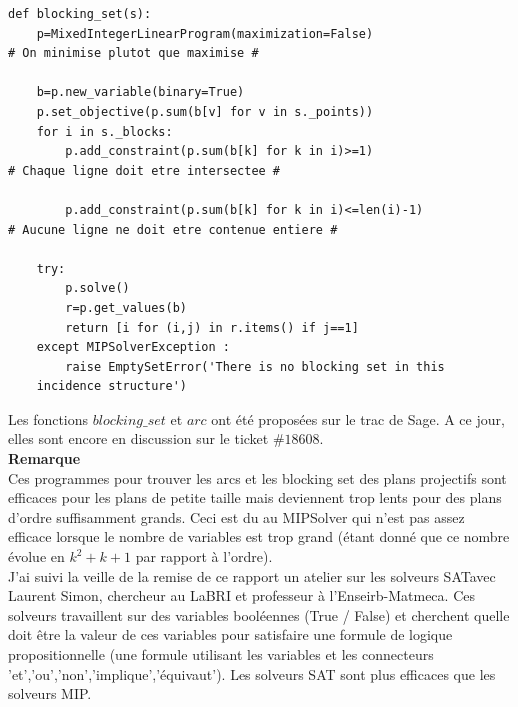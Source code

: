 \documentclass[a4paper]{article}
\begin{document}
\begin{lstlisting}
def blocking_set(s):
    p=MixedIntegerLinearProgram(maximization=False)
# On minimise plutot que maximise #

    b=p.new_variable(binary=True)
    p.set_objective(p.sum(b[v] for v in s._points))
    for i in s._blocks:
        p.add_constraint(p.sum(b[k] for k in i)>=1)
# Chaque ligne doit etre intersectee #

        p.add_constraint(p.sum(b[k] for k in i)<=len(i)-1)
# Aucune ligne ne doit etre contenue entiere #
        
    try:
        p.solve()
        r=p.get_values(b)
        return [i for (i,j) in r.items() if j==1]
    except MIPSolverException :
        raise EmptySetError('There is no blocking set in this
    incidence structure')  
\end{lstlisting}
\vspace{1\baselineskip}
Les fonctions $blocking\_set$ et $arc$ ont été proposées sur le trac de Sage. A ce jour, elles sont encore en discussion sur le ticket $\#18608$.\vspace{3\baselineskip}\\

\textbf{Remarque}\\
Ces programmes pour trouver les arcs et les blocking set des plans projectifs sont efficaces pour les plans de petite taille mais deviennent trop lents pour des plans d'ordre suffisamment grands. Ceci est du au MIPSolver qui n'est pas assez efficace lorsque le nombre de variables est trop grand (étant donné que ce nombre évolue en $k^2 + k + 1$ par rapport à l'ordre).\\
J'ai suivi la veille de la remise de ce rapport un atelier sur les solveurs SATavec Laurent Simon, chercheur au LaBRI et professeur à l'Enseirb-Matmeca. Ces solveurs travaillent sur des variables booléennes (True / False) et cherchent quelle doit être la valeur de ces variables pour satisfaire une formule de logique propositionnelle (une formule utilisant les variables et les connecteurs 'et','ou','non','implique','équivaut'). Les solveurs SAT sont plus efficaces que les solveurs MIP.
\newpage
\end{document}
